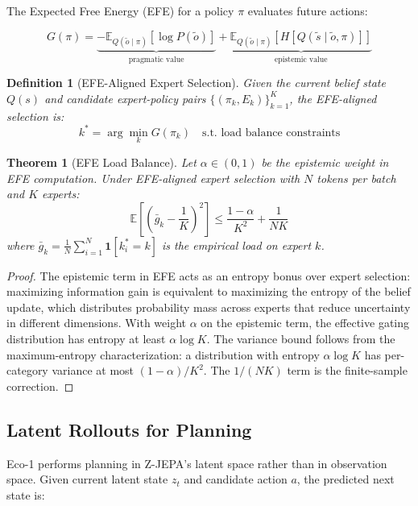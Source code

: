 \documentclass[11pt,letterpaper]{article}
\newtheorem{theorem}{Theorem}[section]
\newtheorem{definition}{Definition}[section]
\newcommand{\E}{\mathbb{E}}
\begin{document}
The Expected Free Energy (EFE) for a policy $\pi$ evaluates future actions:

\begin{equation}
G(\pi) = \underbrace{-\E_{Q(\tilde{o} \mid \pi)}[\log P(\tilde{o})]}_{\text{pragmatic value}} + \underbrace{\E_{Q(\tilde{o} \mid \pi)}[H[Q(\tilde{s} \mid \tilde{o}, \pi)]]}_{\text{epistemic value}}
\label{eq:efe}
\end{equation}

\begin{definition}[EFE-Aligned Expert Selection]
Given the current belief state $Q(s)$ and candidate expert-policy pairs $\{(\pi_k, E_k)\}_{k=1}^K$, the EFE-aligned selection is:
\[
k^* = \arg\min_k G(\pi_k) \quad \text{s.t. load balance constraints}
\]
\end{definition}

\begin{theorem}[EFE Load Balance]
\label{thm:load_balance}
Let $\alpha \in (0, 1)$ be the epistemic weight in EFE computation. Under EFE-aligned expert selection with $N$ tokens per batch and $K$ experts:
\[
\E\!\left[\left(\bar{g}_k - \frac{1}{K}\right)^2\right] \leq \frac{1-\alpha}{K^2} + \frac{1}{NK}
\]
where $\bar{g}_k = \frac{1}{N}\sum_{i=1}^N \mathbf{1}[k_i^* = k]$ is the empirical load on expert $k$.
\end{theorem}

\begin{proof}
The epistemic term in EFE acts as an entropy bonus over expert selection: maximizing information gain is equivalent to maximizing the entropy of the belief update, which distributes probability mass across experts that reduce uncertainty in different dimensions. With weight $\alpha$ on the epistemic term, the effective gating distribution has entropy at least $\alpha \log K$. The variance bound follows from the maximum-entropy characterization: a distribution with entropy $\alpha \log K$ has per-category variance at most $(1-\alpha)/K^2$. The $1/(NK)$ term is the finite-sample correction.
\end{proof}

\subsection{Latent Rollouts for Planning}

Eco-1 performs planning in Z-JEPA's latent space rather than in observation space. Given current latent state $z_t$ and candidate action $a$, the predicted next state is:
\end{document}
